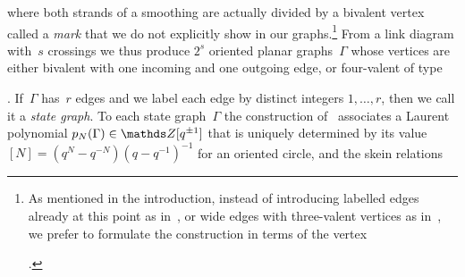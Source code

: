 \documentclass{compositio}
\theoremstyle{definition}
\numberwithin{equation}{section}
\begin{document}
where both strands of a smoothing are actually divided by a bivalent vertex called a \emph{mark} that we do not explicitly show in  our graphs.\footnote{As  mentioned in the introduction, instead of introducing labelled edges already at this point as in~\cite{moy1998}, or wide edges with three-valent vertices as in~\cite{kr0401268}, we prefer to formulate the construction in terms of the vertex  \begin{minipage}{0.38cm}
\end{minipage}.} 
From a link diagram with~$s$ crossings we thus produce $2^s$ oriented planar graphs~$\Gamma$ whose vertices are either bivalent with one incoming and one outgoing edge, or four-valent of type 
 \begin{minipage}{0.48cm}
\end{minipage}. If~$\Gamma$ has~$r$ edges and we label each edge by distinct integers $1,\ldots,r$, then we call it a \emph{state graph}. To each state graph~$\Gamma$ the construction of~\cite{moy1998} associates a Laurent polynomial $p_{N}(\Gamma)\in\nZ[q^{\pm 1}]$ that is uniquely determined by its value $[N]=(q^N-q^{-N})(q-q^{-1})^{-1}$ for an oriented circle, and the skein relations
\end{document}
